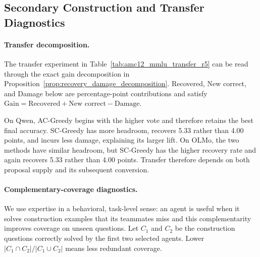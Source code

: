\clearpage
\subsection{Secondary Construction and Transfer Diagnostics}
\label{app:secondary_construction_diagnostics}
\paragraph{Transfer decomposition.}
The transfer experiment in Table~\ref{tab:amc12_mmlu_transfer_r5} can be read
through the exact gain decomposition in
Proposition~\ref{prop:recovery_damage_decomposition}.
Recovered, New correct, and Damage below are percentage-point contributions and
satisfy $\text{Gain}=\text{Recovered}+\text{New correct}-\text{Damage}$.

\begin{table}[H]
\centering
\caption{AMC12-to-MMLU-Redux transfer decomposition. Recovery rate is
conditional on R0 headroom; the contribution columns are unconditional
percentage points.}
\label{tab:transfer_decomposition}
\small
{}
\end{table}

On Qwen, AC-Greedy begins with the higher vote and therefore retains the best
final accuracy. SC-Greedy has more headroom, recovers 5.33 rather than 4.00
points, and incurs less damage, explaining its larger lift. On OLMo, the two
methods have similar headroom, but SC-Greedy has the higher recovery rate and
again recovers 5.33 rather than 4.00 points. Transfer therefore depends on both
proposal supply and its subsequent conversion.

\paragraph{Complementary-coverage diagnostics.}
We use expertise in a behavioral, task-level sense: an agent is useful when it
solves construction examples that its teammates miss and this complementarity
improves coverage on unseen questions. Let $C_1$ and $C_2$ be the construction
questions correctly solved by the first two selected agents. Lower
$|C_1\cap C_2|/|C_1\cup C_2|$ means less redundant coverage.

